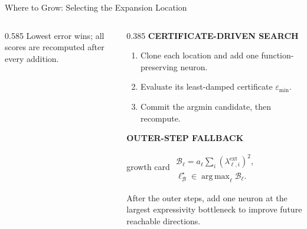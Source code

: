 \begin{frame}[t]{Where to Grow: Selecting the Expansion Location}
\begin{columns}[T,onlytextwidth]
\begin{column}{0.585\textwidth}
      \vspace{0.07cm}
      {\fontsize{6.75}{8.0}\selectfont
      Lowest error wins; all scores are recomputed after every addition.}
    \end{column}

    \begin{column}{0.385\textwidth}
      {\color{EnstaBlue}\bfseries\scriptsize CERTIFICATE-DRIVEN SEARCH}
      \vspace{0.04cm}

      {\fontsize{6.85}{8.2}\selectfont
      \begin{enumerate}
        \setlength{\itemsep}{0.07cm}
        \item Clone each location and add one function-preserving neuron.
        \item Evaluate its least-damped certificate $\varepsilon_{\min}$.
        \item Commit the argmin candidate, then recompute.
      \end{enumerate}}

      \vspace{0.05cm}
      {\color{EnstaBlue}\bfseries\scriptsize OUTER-STEP FALLBACK}
      \vspace{0.03cm}

      \begin{beamercolorbox}[rounded=true,sep=0.10cm,wd=\linewidth]{growth card}
        \centering
        \fontsize{6.6}{7.9}\selectfont
        \(\displaystyle
          \begin{gathered}
            \mathcal B_\ell
            =a_\ell\sum_i\left(\lambda_{\ell,i}^{\mathrm{ext}}\right)^2,\\[5pt]
            \ell_{\mathcal B}^\star
            \in\operatorname*{arg\,max}_{\ell}\mathcal B_\ell.
          \end{gathered}
        \)
      \end{beamercolorbox}

      \vspace{0.07cm}
      {\fontsize{6.75}{8.0}\selectfont
      After the outer steps, add one neuron at the largest expressivity
      bottleneck to improve future reachable directions.}
    \end{column}
  \end{columns}
\end{frame}
